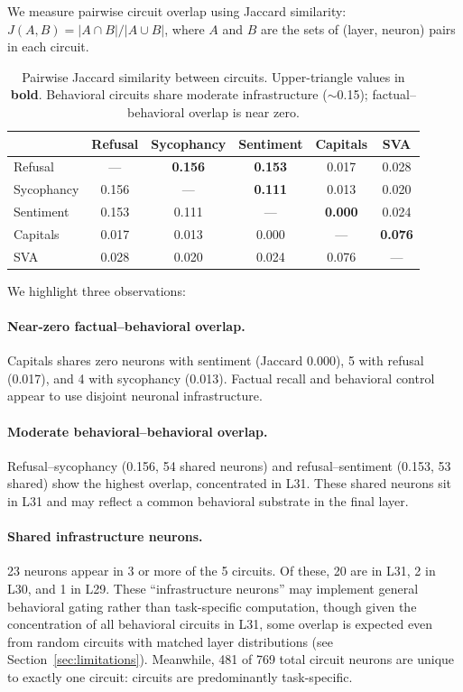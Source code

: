 \documentclass[11pt]{article}
\begin{document}
We measure pairwise circuit overlap using Jaccard similarity: $J(A, B) = |A \cap B| / |A \cup B|$, where $A$ and $B$ are the sets of (layer, neuron) pairs in each circuit.

\begin{table}[htbp]
\centering
\caption{Pairwise Jaccard similarity between circuits. Upper-triangle values in \textbf{bold}. Behavioral circuits share moderate infrastructure (${\sim}$0.15); factual--behavioral overlap is near zero.}
\label{tab:jaccard}
\small
\begin{tabular}{lccccc}
\toprule
& \textbf{Refusal} & \textbf{Sycophancy} & \textbf{Sentiment} & \textbf{Capitals} & \textbf{SVA} \\
\midrule
Refusal     & ---     & \textbf{0.156} & \textbf{0.153} & 0.017 & 0.028 \\
Sycophancy  & 0.156 & ---     & \textbf{0.111} & 0.013 & 0.020 \\
Sentiment   & 0.153 & 0.111 & ---     & \textbf{0.000} & 0.024 \\
Capitals    & 0.017 & 0.013 & 0.000 & ---     & \textbf{0.076} \\
SVA         & 0.028 & 0.020 & 0.024 & 0.076 & --- \\
\bottomrule
\end{tabular}
\end{table}

We highlight three observations:

\paragraph{Near-zero factual--behavioral overlap.}
Capitals shares zero neurons with sentiment (Jaccard 0.000), 5 with refusal (0.017), and 4 with sycophancy (0.013).
Factual recall and behavioral control appear to use disjoint neuronal infrastructure.

\paragraph{Moderate behavioral--behavioral overlap.}
Refusal--sycophancy (0.156, 54 shared neurons) and refusal--sentiment (0.153, 53 shared) show the highest overlap, concentrated in L31.
These shared neurons sit in L31 and may reflect a common behavioral substrate in the final layer.

\paragraph{Shared infrastructure neurons.}
23 neurons appear in 3 or more of the 5 circuits.
Of these, 20 are in L31, 2 in L30, and 1 in L29.
These ``infrastructure neurons'' may implement general behavioral gating rather than task-specific computation, though given the concentration of all behavioral circuits in L31, some overlap is expected even from random circuits with matched layer distributions (see Section~\ref{sec:limitations}).
Meanwhile, 481 of 769 total circuit neurons are unique to exactly one circuit: circuits are predominantly task-specific.
\end{document}
